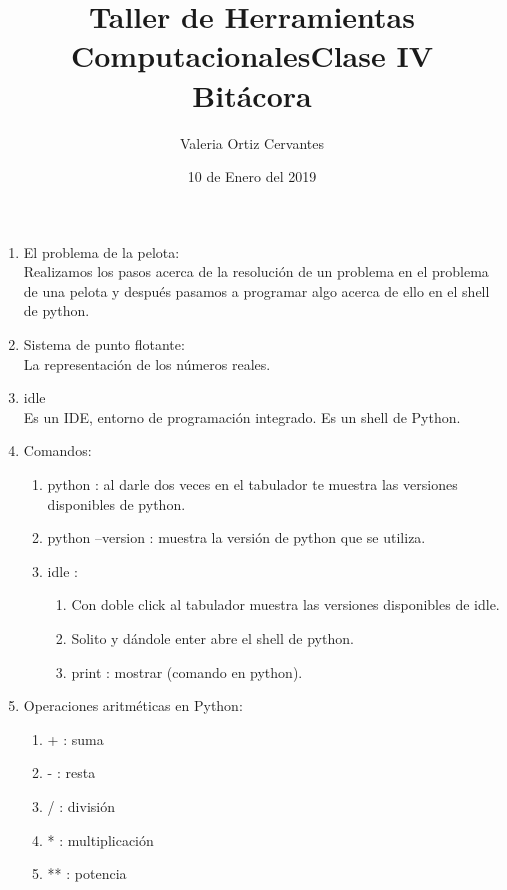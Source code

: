 \documentclass[letterpaper, 12pt, oneside]{article} %
\title{\Huge Taller de Herramientas Computacionales}
\author{Valeria Ortiz Cervantes}
\date{10 de Enero del 2019}
\begin{document}
	\maketitle
	\newpage
	\title{Clase IV\\Bitácora\\}
	\begin{enumerate}
		\item El problema de la pelota:\\Realizamos los pasos acerca de la resolución de un problema en el problema de una pelota y después pasamos a programar algo acerca de ello en el shell de python.
		\item Sistema de punto flotante:\\La representación de los números reales.
		\item idle\\ Es un IDE, entorno de programación integrado. Es un shell de Python.
		\item Comandos:
		\begin{enumerate}
			\item python : al darle dos veces en el tabulador te muestra las versiones disponibles de python.
			\item python --version : muestra la versión de python que se utiliza.
			\item idle : 
			\begin{enumerate}
				\item Con doble click al tabulador muestra las versiones disponibles de idle.
				\item Solito y dándole enter abre el shell de python.
				\item print : mostrar (comando en python).
			\end{enumerate}
		\end{enumerate}
			\item Operaciones aritméticas en Python:
			\begin{enumerate}
				\item + : suma
				\item - : resta 
				\item / : división
				\item * : multiplicación
				\item ** : potencia
			\end{enumerate}
	\end{enumerate}
\end{document}
